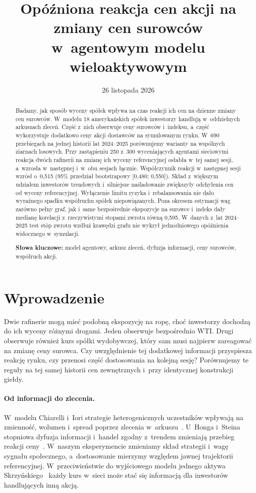 \documentclass[11pt,a4paper]{article}
\title{Opóźniona reakcja cen akcji na zmiany cen surowców w~agentowym modelu wieloaktywowym}
\author{\zespol}
\date{26 listopada 2026}
\begin{document}
\maketitle
\begin{abstract}
Badamy, jak sposób wyceny spółek wpływa na czas reakcji ich cen na dzienne zmiany cen surowców.
W~modelu 18 amerykańskich spółek inwestorzy handlują w~oddzielnych arkuszach zleceń. Część z~nich obserwuje ceny surowców i~indeksu,
a~część wykorzystuje dodatkowo ceny akcji dostawców na symulowanym rynku.
W~690 przebiegach na jednej historii lat 2024--2025 porównujemy warianty na wspólnych ziarnach losowych.
Przy zastąpieniu 250 z~300 wyceniających agentami sieciowymi reakcja dwóch rafinerii na zmianę ich wyceny
referencyjnej osłabła w~tej samej sesji, a~wzrosła w~następnej i~w~obu sesjach łącznie. Współczynnik reakcji
w~następnej sesji wzrósł o~0,515 (95\% przedział bootstrapowy [0,480; 0,550]).
Skład z~większym udziałem inwestorów trendowych i~silniejsze naśladowanie zwiększyły odchylenia cen od wyceny
referencyjnej. Wyłączenie limitu ryzyka i~rebalansowania nie dało wyraźnego spadku współruchu spółek niepowiązanych.
Poza okresem estymacji wag zarówno pełny graf, jak i~same bezpośrednie ekspozycje na surowce i~indeks
dały medianę korelacji z~rzeczywistymi stopami zwrotu równą 0,595. W~danych z~lat 2024--2025 test stóp
zwrotu wzdłuż krawędzi grafu nie wykrył jednodniowego opóźnienia widocznego w~symulacji.
\par\medskip\noindent\textbf{Słowa kluczowe:} model agentowy, arkusz zleceń, dyfuzja informacji, ceny surowców, współruch akcji.
\end{abstract}

\section{Wprowadzenie}\label{sec:wprowadzenie}
Dwie rafinerie mogą mieć podobną ekspozycję na ropę, choć inwestorzy dochodzą do ich wyceny różnymi drogami.
Jeden obserwuje bezpośrednio WTI. Drugi obserwuje również kurs spółki wydobywczej, który sam musi najpierw
zareagować na zmianę ceny surowca. Czy uwzględnienie tej dodatkowej informacji przyspiesza reakcję rynku,
czy przenosi część dostosowania na kolejną sesję? Porównujemy te reguły na tej samej historii cen zewnętrznych
i~przy identycznej konstrukcji giełdy.

\paragraph{Od informacji do zlecenia.}
W~modelu Chiarelli i~Iori strategie heterogenicznych uczestników wpływają na zmienność, wolumen i~spread poprzez zlecenia
w~arkuszu~\cite{chiarella-iori}. U~Honga i~Steina stopniowa dyfuzja informacji i~handel zgodny z~trendem zmieniają
przebieg reakcji ceny~\cite{hongstein1999}. W~naszym eksperymencie zmieniamy skład strategii i~wagę sygnału społecznego,
a~dostosowanie mierzymy względem jawnej trajektorii referencyjnej. W~przeciwieństwie do wyjściowego modelu jednego aktywa
Skrzyńskiego~\cite{skrzynski} każdy kurs w~sieci może stać się informacją dla inwestorów handlujących inną akcją.
\end{document}
